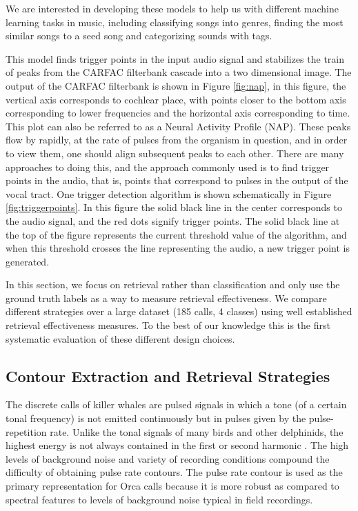 We are interested in developing these models to help us with different
machine learning tasks in music, including classifying songs into
genres, finding the most similar songs to a seed song and categorizing
sounds with tags.

This model finds trigger points in the input audio signal and
stabilizes the train of peaks from the CARFAC filterbank cascade into
a two dimensional image.  The output of the CARFAC filterbank is shown
in Figure \ref{fig:nap}, in this figure, the vertical axis corresponds
to cochlear place, with points closer to the bottom axis corresponding
to lower frequencies and the horizontal axis corresponding to time.
This plot can also be referred to as a Neural Activity Profile (NAP).
These peaks flow by rapidly, at the rate of pulses from the organism
in question, and in order to view them, one should align subsequent
peaks to each other.  There are many approaches to doing this, and the
approach commonly used is to find trigger points in the audio, that
is, points that correspond to pulses in the output of the vocal tract.
One trigger detection algorithm is shown schematically in Figure
\ref{fig:triggerpoints}.  In this figure the solid black line in the
center corresponds to the audio signal, and the red dots signify
trigger points.  The solid black line at the top of the figure
represents the current threshold value of the algorithm, and when this
threshold crosses the line representing the audio, a new trigger point
is generated.

In this section, we focus on retrieval rather than classification and
only use the ground truth labels as a way to measure retrieval
effectiveness. We compare different strategies over a large dataset
(185 calls, 4 classes) using well established retrieval effectiveness
measures. To the best of our knowledge this is the first systematic
evaluation of these different design choices.

\subsection{Contour Extraction and Retrieval Strategies}  

The discrete calls of killer whales are pulsed signals in which a tone
(of a certain tonal frequency) is not emitted continuously but in
pulses given by the pulse-repetition rate. Unlike the tonal signals of
many birds and other delphinids, the highest energy is not always
contained in the first or second harmonic
\cite{deecke99_quantifying_orca}. The high levels of background noise
and variety of recording conditions compound the difficulty of
obtaining pulse rate contours. The pulse rate contour is used as the
primary representation for Orca calls because it is more robust as
compared to spectral features to levels of background noise typical in
field recordings.

